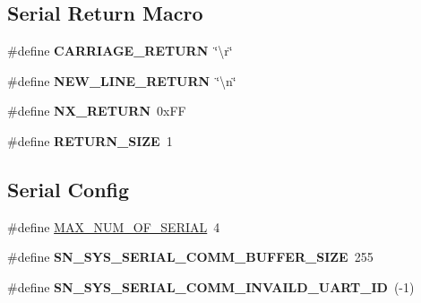 \subsection*{Serial Return Macro}
\begin{DoxyCompactItemize}
\item 
\mbox{\label{group__SYSTEM__SERIAL__COMM_ga3b81478c7058ceb6ed610ce8e2ca3822}} 
\#define {\bfseries C\+A\+R\+R\+I\+A\+G\+E\+\_\+\+R\+E\+T\+U\+RN}~\char`\"{}\textbackslash{}r\char`\"{}
\item 
\mbox{\label{group__SYSTEM__SERIAL__COMM_ga501b77360464523474ef3fd6076599d5}} 
\#define {\bfseries N\+E\+W\+\_\+\+L\+I\+N\+E\+\_\+\+R\+E\+T\+U\+RN}~\char`\"{}\textbackslash{}n\char`\"{}
\item 
\mbox{\label{group__SYSTEM__SERIAL__COMM_gaab38bc7c033c5c8a5443736e6adf31ec}} 
\#define {\bfseries N\+X\+\_\+\+R\+E\+T\+U\+RN}~0x\+FF
\item 
\mbox{\label{group__SYSTEM__SERIAL__COMM_ga5a476228d4333eaa5eb9148399655d60}} 
\#define {\bfseries R\+E\+T\+U\+R\+N\+\_\+\+S\+I\+ZE}~1
\end{DoxyCompactItemize}
\subsection*{Serial Config}
\begin{DoxyCompactItemize}
\item 
\#define \hyperlink{group__SYSTEM__SERIAL__COMM_gab19b7880962ae52d90f784158f56f9f5}{M\+A\+X\+\_\+\+N\+U\+M\+\_\+\+O\+F\+\_\+\+S\+E\+R\+I\+AL}~4
\item 
\mbox{\label{group__SYSTEM__SERIAL__COMM_ga741f5eba82633e103f491a30e0f9696a}} 
\#define {\bfseries S\+N\+\_\+\+S\+Y\+S\+\_\+\+S\+E\+R\+I\+A\+L\+\_\+\+C\+O\+M\+M\+\_\+\+B\+U\+F\+F\+E\+R\+\_\+\+S\+I\+ZE}~255
\item 
\mbox{\label{group__SYSTEM__SERIAL__COMM_gab3cb3e808e6aa6d23c73d7687b3b937e}} 
\#define {\bfseries S\+N\+\_\+\+S\+Y\+S\+\_\+\+S\+E\+R\+I\+A\+L\+\_\+\+C\+O\+M\+M\+\_\+\+I\+N\+V\+A\+I\+L\+D\+\_\+\+U\+A\+R\+T\+\_\+\+ID}~(-\/1)
\end{DoxyCompactItemize}
